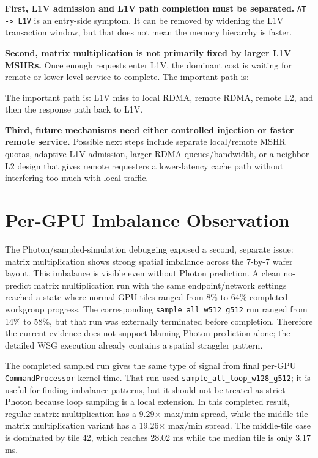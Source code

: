 \documentclass[sigconf,screen,review]{acmart}
\begin{document}
\textbf{First, L1V admission and L1V path completion must be separated.}
\texttt{AT -> L1V} is an entry-side symptom.  It can be removed by widening the
L1V transaction window, but that does not mean the memory hierarchy is faster.

\textbf{Second, matrix multiplication is not primarily fixed by larger L1V
MSHRs.}  Once enough requests enter L1V, the dominant cost is waiting for
remote or lower-level service to complete.  The important path is:

The important path is: L1V miss to local RDMA, remote RDMA, remote L2, and
then the response path back to L1V.

\textbf{Third, future mechanisms need either controlled injection or faster
remote service.}  Possible next steps include separate local/remote MSHR
quotas, adaptive L1V admission, larger RDMA queues/bandwidth, or a neighbor-L2
design that gives remote requesters a lower-latency cache path without
interfering too much with local traffic.

\section{Per-GPU Imbalance Observation}

The Photon/sampled-simulation debugging exposed a second, separate issue:
matrix multiplication shows strong spatial imbalance across the 7-by-7
wafer layout.  This imbalance is visible even without Photon prediction.  A
clean no-predict matrix multiplication run with the same endpoint/network
settings reached a state where normal GPU tiles ranged from 8\% to 64\%
completed workgroup progress.  The corresponding
\texttt{sample\_all\_w512\_g512} run ranged from 14\% to 58\%, but that run
was externally terminated before completion.  Therefore the current evidence
does not support blaming Photon prediction alone; the detailed WSG execution
already contains a spatial straggler pattern.

The completed sampled run gives the same type of signal from final per-GPU
\texttt{CommandProcessor} kernel time.  That run used
\texttt{sample\_all\_loop\_w128\_g512}; it is useful for finding imbalance
patterns, but it should not be treated as strict Photon because loop sampling
is a local extension.  In this completed result, regular matrix multiplication
has a 9.29$\times$ max/min spread, while the middle-tile matrix multiplication
variant has a 19.26$\times$ max/min spread.  The middle-tile case is dominated
by tile 42, which reaches 28.02 ms while the median tile is only 3.17 ms.
\end{document}
